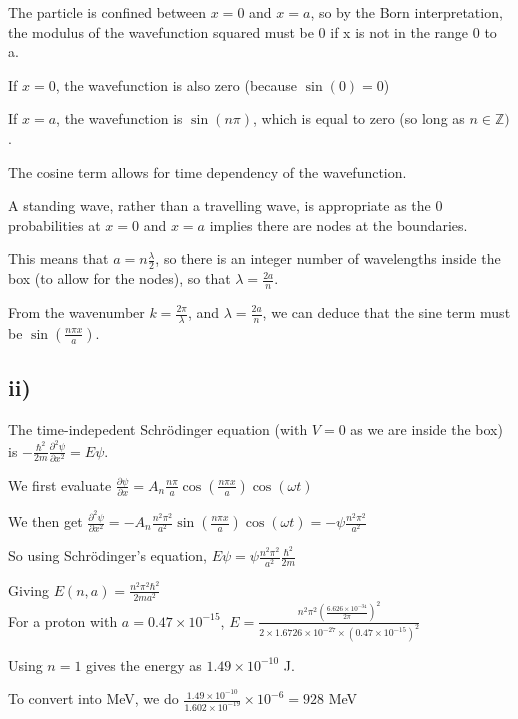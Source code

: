\documentclass{article}
\begin{document}
The particle is confined between $x =0 $ and $x = a$, so by the Born interpretation, the modulus of the wavefunction squared must be 0 if x is not in the range 0 to a. 

If $x=0$, the wavefunction is also zero (because $\sin{(0)}=0$)

If $x=a$, the wavefunction is $\sin{(n\pi)}$, which is equal to zero (so long as $n \in \mathbb{Z})$.

The cosine term allows for time dependency of the wavefunction.

A standing wave, rather than a travelling wave, is appropriate as the 0 probabilities at $x=0$ and $x=a$ implies there are nodes at the boundaries.

This means that $a = n\frac{\lambda}{2}$, so there is an integer number of wavelengths inside the box (to allow for the nodes), so that $\lambda = \frac{2a}{n}$. 

From the wavenumber $k = \frac{2\pi}{\lambda}$, and $\lambda = \frac{2a}{n}$, we can deduce that the sine term must be $\sin({\frac{n\pi x}{a}})$.


\subsection*{ii)}

The time-indepedent Schrödinger equation (with $V=0$ as we are inside the box) is $
-\frac{\hbar^2}{2m}\frac{\partial^2 \psi}{\partial x^2} = E\psi$.

We first evaluate $\frac{\partial \psi}{\partial x} = A_n\frac{n\pi}{a}\cos(\frac{{n\pi x}}{a})\cos({\omega t})$

We then get $\frac{\partial^2 \psi}{\partial x^2} = -A_n\frac{n^2\pi^2}{a^2}\sin(\frac{{n\pi x}}{a})\cos({\omega t}) = -\psi \frac{n^2\pi^2}{a^2}$

So using Schrödinger's equation, $E\psi = \psi \frac{n^2\pi^2}{a^2}\frac{\hbar^2}{2m}$

Giving $E (n, a) = \frac{n^2\pi^2 \hbar^2}{2ma^2}$
\\

For a proton with $a = 0.47 \times 10^{-15}$, $E = \frac{n^2 \pi^2 (\frac{6.626\times10^{-34}}{2\pi})^2}{2 \times 1.6726 \times 10^{-27} \times (0.47\times10^{-15}) ^2}$

Using $n=1$ gives the energy as $1.49 \times 10^{-10}$ J.
 
To convert into MeV, we do $\frac{1.49 \times 10^{-10}}{1.602\times10^{-19}} \times 10^{-6} = 928$ MeV
\end{document}

